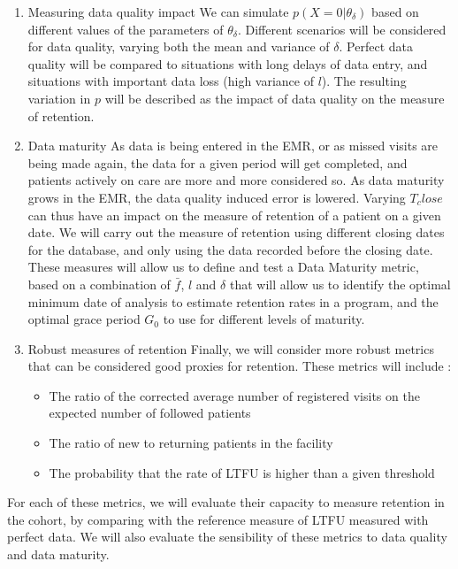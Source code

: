 \begin{enumerate}

\item{Measuring data quality impact} We can simulate $ p(X = 0 | \theta_{\delta})$ based on different values of the parameters of $\theta_{\delta}$. Different scenarios will be considered for data quality, varying both the mean and variance of $\delta$. Perfect data quality will be compared to situations with long delays of data entry, and situations with important data loss (high variance of $l$). The resulting variation in $p$ will be described as the impact of data quality on the measure of retention.

\item{Data maturity} As data is being entered in the EMR, or as missed visits are being made again, the data for a given period will get completed, and patients actively on care are more and more considered so. As data maturity grows in the EMR, the data quality induced error is lowered. Varying $T_close$ can thus have an impact on the measure of retention of a patient on a given date. We will carry out the measure of retention using different closing dates for the database, and only using the data recorded before the closing date. These measures will allow us to define and test a Data Maturity metric, based on a combination of $\bar{f}$, $l$ and $\delta$ that will allow us to identify the optimal minimum date of analysis to estimate retention rates in a program, and the optimal grace period $G_0$ to use for different levels of maturity.

\item{Robust measures of retention} Finally, we will consider more robust metrics that can be considered good proxies for retention. These metrics will include :
\begin{itemize}
	\item The ratio of the corrected average number of registered visits on the expected number of followed patients
	\item The ratio of new to returning patients in the facility
	\item The probability that the rate of LTFU is higher than a given threshold
\end{itemize}
\end{enumerate}

For each of these metrics, we will evaluate their capacity to measure retention in the cohort, by comparing with the reference measure of LTFU measured with perfect data. We will also evaluate the sensibility of these metrics to data quality and data maturity.

